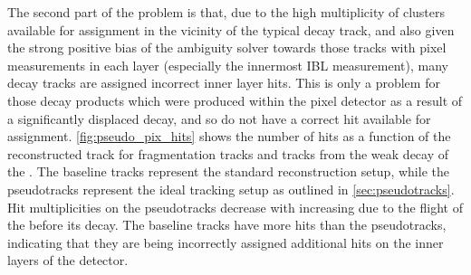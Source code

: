 The second part of the problem is that, due to the high multiplicity of clusters available for assignment in the vicinity of the typical \highpt \bhadron decay track, and also given the strong positive bias of the ambiguity solver towards those tracks with pixel measurements in each layer (especially the innermost IBL measurement), many \bhadron decay tracks are assigned incorrect inner layer hits.
This is only a problem for those decay products which were produced within the pixel detector as a result of a significantly displaced \bhadron decay, and so do not have a correct hit available for assignment.
\cref{fig:pseudo_pix_hits} shows the number of hits as a function of the reconstructed track \pt for fragmentation tracks and tracks from the weak decay of the \bhadron.
The baseline tracks represent the standard reconstruction setup, while the pseudotracks represent the ideal tracking setup as outlined in \cref{sec:pseudotracks}.
Hit multiplicities on the pseudotracks decrease with increasing \pt due to the flight of the \bhadron before its decay. 
The baseline tracks have more hits than the pseudotracks, indicating that they are being incorrectly assigned additional hits on the inner layers of the detector.

